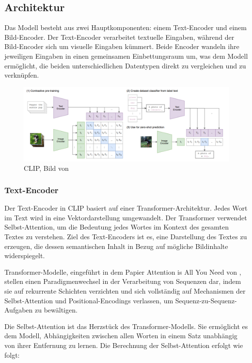 \documentclass[nolibertine, ngerman, algorithm, nomencl, minted]{ttlab-qualify}
\begin{document}
\subsection{Architektur}
Das Modell besteht aus zwei Hauptkomponenten: einem Text-Encoder und einem Bild-Encoder. Der Text-Encoder verarbeitet textuelle Eingaben, während der Bild-Encoder sich um visuelle Eingaben kümmert. Beide Encoder wandeln ihre jeweiligen Eingaben in einen gemeinsamen Einbettungsraum um, was dem Modell ermöglicht, die beiden unterschiedlichen Datentypen direkt zu vergleichen und zu verknüpfen.
\begin{figure}[h]
	\centering
	\includegraphics[scale=0.4]{static/CLIP.png}
	\caption{CLIP, Bild von \textcite[2]{radford2021learning}}
	\label{fig:2.4}
\end{figure}
\subsubsection{Text-Encoder}
Der Text-Encoder in CLIP basiert auf einer Transformer-Architektur. 
Jedes Wort im Text wird in eine Vektordarstellung umgewandelt. 
Der Transformer verwendet Selbst-Attention, um die Bedeutung jedes Wortes 
im Kontext des gesamten Textes zu verstehen. Ziel des Text-Encoders ist es, 
eine Darstellung des Textes zu erzeugen, die dessen semantischen Inhalt in Bezug auf mögliche Bildinhalte widerspiegelt.

Transformer-Modelle, eingeführt in dem Papier \glqq Attention is All You Need\grqq 
von \textcite{vaswani2017attention}, stellen einen Paradigmenwechsel in der 
Verarbeitung von Sequenzen dar, indem sie auf rekurrente Schichten verzichten 
und sich vollständig auf Mechanismen der Selbst-Attention und Positional-Encodings 
verlassen, um Sequenz-zu-Sequenz-Aufgaben zu bewältigen.

Die Selbst-Attention ist das Herzstück des Transformer-Modells. Sie ermöglicht es dem Modell, 
Abhängigkeiten zwischen allen Worten in einem Satz unabhängig von ihrer Entfernung zu lernen. 
Die Berechnung der Selbst-Attention erfolgt wie folgt:
\end{document}
